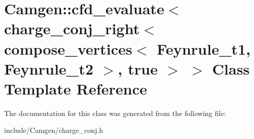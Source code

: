 \hypertarget{a00046}{\section{Camgen\-:\-:cfd\-\_\-evaluate$<$ charge\-\_\-conj\-\_\-right$<$ compose\-\_\-vertices$<$ Feynrule\-\_\-t1, Feynrule\-\_\-t2 $>$, true $>$ $>$ Class Template Reference}
\label{a00046}
}


The documentation for this class was generated from the following file\-:\begin{DoxyCompactItemize}
\item 
include/\-Camgen/charge\-\_\-conj.\-h\end{DoxyCompactItemize}
